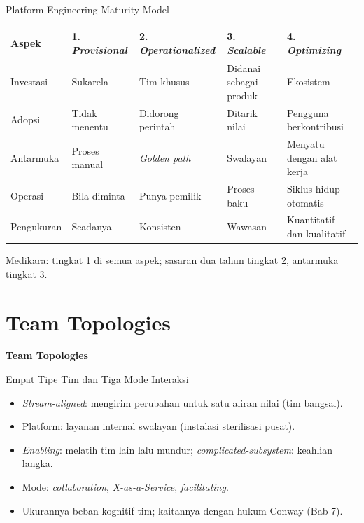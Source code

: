 \documentclass[aspectratio=169, table, 12pt]{beamer}
\begin{document}
\begin{frame}{{\Large Platform Engineering Maturity Model}}
  \footnotesize
  \begin{tabularx}{\textwidth}{>{\raggedright\arraybackslash}p{2.0cm}
      >{\raggedright\arraybackslash}X >{\raggedright\arraybackslash}X
      >{\raggedright\arraybackslash}X >{\raggedright\arraybackslash}X}
    \hline
    \textbf{Aspek} & \textbf{1. \textit{Provisional}} & \textbf{2. \textit{Operationalized}} &
      \textbf{3. \textit{Scalable}} & \textbf{4. \textit{Optimizing}} \\
    \hline
    Investasi & Sukarela & Tim khusus & Didanai sebagai produk & Ekosistem \\
    \hline
    Adopsi & Tidak menentu & Didorong perintah & Ditarik nilai & Pengguna berkontribusi \\
    \hline
    Antarmuka & Proses manual & \textit{Golden path} & Swalayan & Menyatu dengan alat kerja \\
    \hline
    Operasi & Bila diminta & Punya pemilik & Proses baku & Siklus hidup otomatis \\
    \hline
    Pengukuran & Seadanya & Konsisten & Wawasan & Kuantitatif dan kualitatif \\
    \hline
  \end{tabularx}

  \vspace{8pt}
  \small Medikara: tingkat 1 di semua aspek; sasaran dua tahun tingkat 2, antarmuka tingkat 3.
\end{frame}

\section{Team Topologies}

\begin{frame}{\hfill}
  \centering
  \Huge{\textbf{Team Topologies}}
\end{frame}

\begin{frame}{{\Large Empat Tipe Tim dan Tiga Mode Interaksi}}
  \vspace{10pt}
  \begin{itemize}
    \item \textit{Stream-aligned}: mengirim perubahan untuk satu aliran nilai (tim bangsal).
    \item Platform: layanan internal swalayan (instalasi sterilisasi pusat).
    \item \textit{Enabling}: melatih tim lain lalu mundur; \textit{complicated-subsystem}:
          keahlian langka.
    \item Mode: \textit{collaboration}, \textit{X-as-a-Service}, \textit{facilitating}.
    \item Ukurannya beban kognitif tim; kaitannya dengan hukum Conway (Bab 7).
  \end{itemize}
\end{frame}
\end{document}
